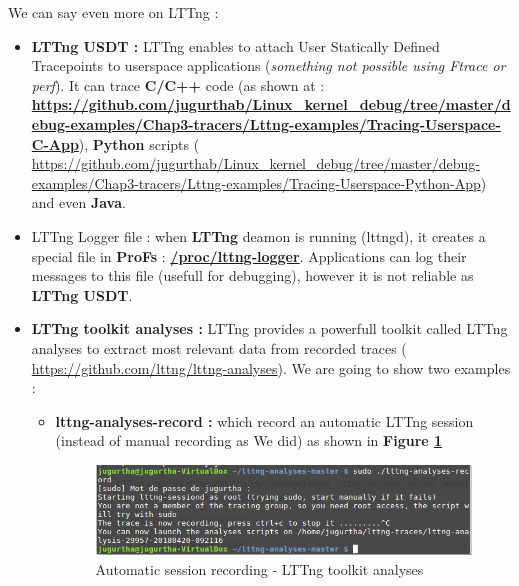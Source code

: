 We can say even more on LTTng : 
\begin{itemize}
	\item \textbf{LTTng USDT : } LTTng enables to attach User Statically Defined Tracepoints to userspace applications (\emph{something not possible using Ftrace or perf}). It can trace \textbf{C/C++} code (as shown at : \textbf{\color{blue}\url{https://github.com/jugurthab/Linux_kernel_debug/tree/master/debug-examples/Chap3-tracers/Lttng-examples/Tracing-Userspace-C-App}}), \textbf{Python} scripts ({\color{blue} \url{https://github.com/jugurthab/Linux_kernel_debug/tree/master/debug-examples/Chap3-tracers/Lttng-examples/Tracing-Userspace-Python-App}}) and even \textbf{Java}. 
	
	\item {LTTng Logger file : } when \textbf{LTTng} deamon is running (lttngd), it creates a special file in \textbf{ProFs} : \textbf{\color{red}\url{/proc/lttng-logger}}.
		Applications can log their messages to this file (usefull for debugging), however it is not reliable as \textbf{LTTng USDT}.
	
	\item \textbf{LTTng toolkit analyses : }
LTTng provides a powerfull toolkit called \og LTTng analyses \fg to extract most relevant data from recorded traces ({\color{blue} \url{https://github.com/lttng/lttng-analyses}}). We are going to show two examples :

		\begin{itemize}
			\item \textbf{lttng-analyses-record : } which record an automatic LTTng session (instead of manual recording as We did) as shown in \textbf{Figure \ref{Automatic session recording - LTTng toolkit analyses}}
					\begin{figure}[H]
						\centering
        				\includegraphics[scale=0.35]{img/solution/lttng-analyses-automatic-record.png}
        				\caption{Automatic session recording - LTTng toolkit analyses}
        				\label{Automatic session recording - LTTng toolkit analyses}
    				\end{figure}
			

\end{itemize}
\end{itemize}
